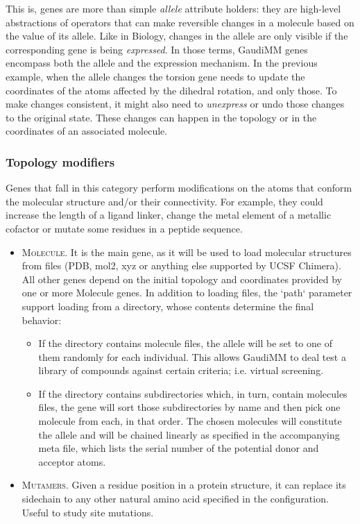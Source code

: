 This is, genes are more than simple \textit{allele} attribute holders: they are high-level abstractions of operators that can make reversible changes in a molecule based on the value of its allele. Like in Biology, changes in the allele are only visible if the corresponding gene is being \textit{expressed}. In those terms, GaudiMM genes encompass both the allele and the expression mechanism. In the previous example, when the allele changes the torsion gene needs to update the coordinates of the atoms affected by the dihedral rotation, and only those. To make changes consistent, it might also need to \textit{unexpress} or undo those changes to the original state. These changes can happen in the topology or in the coordinates of an associated molecule.

\subsubsection{Topology modifiers}
Genes that fall in this category perform modifications on the atoms that conform the molecular structure and/or their connectivity. For example, they could increase the length of a ligand linker, change the metal element of a metallic cofactor or mutate some residues in a peptide sequence.

\begin{itemize}
	\item \textsc{Molecule}. It is the main gene, as it will be used to load molecular structures from files (PDB, mol2, xyz or anything else supported by UCSF Chimera). All other genes depend on the initial topology and coordinates provided by one or more Molecule genes. In addition to loading files, the `path` parameter support loading from a directory, whose contents determine the final behavior:
	\begin{itemize}
		\item If the directory contains molecule files, the allele will be set to one of them randomly for each individual. This allows GaudiMM to deal test a library of compounds against certain criteria; i.e. virtual screening.
		\item If the directory contains subdirectories which, in turn, contain molecules files, the gene will sort those subdirectories by name and then pick one molecule from each, in that order. The chosen molecules will constitute the allele and will be chained linearly as specified in the accompanying meta file, which lists the serial number of the potential donor and acceptor atoms.
	\end{itemize}
	\item \textsc{Mutamers}. Given a residue position in a protein structure, it can replace its sidechain to any other natural amino acid specified in the configuration. Useful to study site mutations.
\end{itemize}

